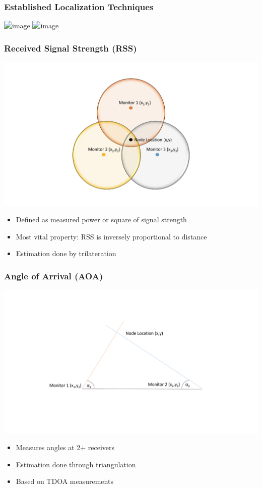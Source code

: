 \documentclass{beamer}
\begin{document}
\begin{frame}
\frametitle{Established Localization Techniques}
\includegraphics<1>[width=.8\textwidth]{algs}
\includegraphics<2>[width=.8\textwidth]{algs1}
\end{frame}

\begin{frame}
\frametitle{Received Signal Strength (RSS)}
\begin{center}
\includegraphics[width=.7\linewidth]{rss.pdf}
\end{center}
\begin{itemize}
\item{Defined as measured power or square of signal strength}
\item{Most vital property: RSS is inversely proportional to distance}
\item{Estimation done by trilateration}
\end{itemize}
\end{frame}

\begin{frame}
\frametitle{Angle of Arrival (AOA)}
\begin{center}
\includegraphics[width=.7\linewidth]{aoa.pdf}
\end{center}
\begin{itemize}
\item{Measures angles at 2+ receivers}
\item{Estimation done through triangulation}
\item{Based on TDOA measurements}
\end{itemize}
\end{frame}
\end{document}
